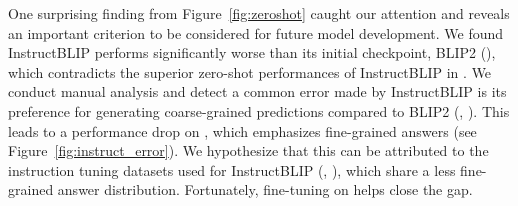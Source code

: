 \documentclass[11pt]{article}
\begin{document}
One surprising finding from Figure~\ref{fig:zeroshot} caught our attention and reveals an important criterion to be considered for future model development.
We found InstructBLIP performs significantly worse than its initial checkpoint, BLIP2 (), which contradicts the superior zero-shot performances of InstructBLIP in \citet{dai2023instructblip}.
We conduct manual analysis and detect a common error made by InstructBLIP is its preference for generating coarse-grained predictions compared to BLIP2 (\eg, ).
This leads to a performance drop on \infoseek, which emphasizes fine-grained answers (see Figure~\ref{fig:instruct_error}). 
We hypothesize that this can be attributed to the instruction tuning datasets used for InstructBLIP (\eg, ), which share a less fine-grained answer distribution.
Fortunately, fine-tuning on \infoseek helps close the gap.
\end{document}
